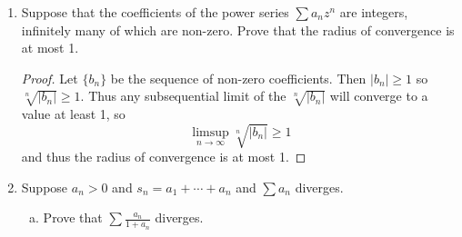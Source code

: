 \documentclass{scrbook}
\renewcommand{\to}{\rightarrow}
\begin{document}
\begin{enumerate}
\begin{enumerate}[(a)]
\begin{proof}
In order for $\sum n^3z^n$ to converge, we must have
\[
	\limsup_{n \to \infty} \left|\frac{n^3z^n}{(n-1)^3z^{n-1}}\right| = |z| < 1
\]
so the radius of convergence is 1.
\end{proof}
\item $\sum \frac{2^n}{n!}z^n$.
\begin{proof}
Using the ratio test, we must have
\[
	\limsup_{n \to \infty} \left|\frac{2^n (n-1)! z^n}{2^{n-1} n! z^{n-1}} \right| = \limsup_{n \to \infty} \frac{2}{n}|z| = 0 < 1
\]
which holds regardless of $z$, so the radius of convergence is $+\infty$.
\end{proof}
\item $\sum \frac{2^n}{n^2} z^n$.
\begin{proof}
Using the ratio test, we must have
\[
	\limsup_{n \to \infty} \left|\frac{2^n (n-1)^2 z^n}{2^{n-1} n^2 z^{n-1}} \right| = \limsup_{n \to \infty} 2 \left|\frac{(n-1)^2}{n^2} \right| |z| = 2|z| < 1
\]
so the radius of convergence is $1/2$.
\end{proof}
\item $\sum \frac{n^3}{3^n} z^n$.

\begin{proof}
By the ratio test, we must have
\[
	\limsup_{n \to \infty} \left|\frac{n^3 3^{n-1} z^n}{(n-1)^3 3^n z^{n-1}} \right| = \limsup_{n \to \infty} \frac{1}{3} \left|\frac{n^3}{(n-1)^3} \right| |z| = \frac{1}{3} |z| < 1
\]
so the radius of convergence is 3.
\end{proof}
\end{enumerate}

\item %
Suppose that the coefficients of the power series $\sum a_nz^n$ are integers, infinitely many of which are non-zero. Prove that the radius of convergence is at most 1.

\begin{proof}
Let $\{b_n\}$ be the sequence of non-zero coefficients. Then $|b_n| \ge 1$ so $\sqrt[n]{|b_n|} \ge 1$. Thus any subsequential limit of the $\sqrt[n]{|b_n|}$ will converge to a value at least 1, so
\[
	\limsup_{n \to \infty} \sqrt[n]{|b_n|} \ge 1
\]
and thus the radius of convergence is at most 1.
\end{proof}

\item %
Suppose $a_n > 0$ and $s_n = a_1 + \dotsb + a_n$ and $\sum a_n$ diverges.
\begin{enumerate}[(a)]
\item Prove that $\sum \frac{a_n}{1 + a_n}$ diverges.


\end{enumerate}
\end{enumerate}
\end{document}
